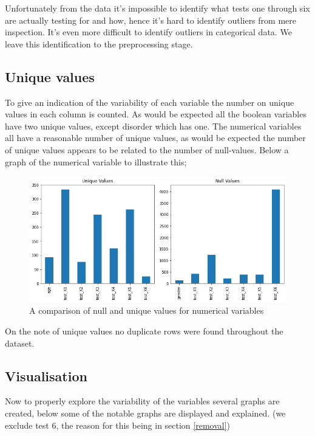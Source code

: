 \documentclass[a4paper]{article}
\begin{document}
Unfortunately from the data it's impossible to identify what tests one through six are actually testing for and how, hence it's hard to identify outliers from mere inspection. It's even more difficult to identify outliers in categorical data. We leave this identification to the preprocessing stage. 

\subsection*{Unique values} %

To give an indication of the variability of each variable the number on unique values in each column is counted. As would be expected all the boolean variables have two unique values, except disorder which has one. The numerical variables all have a reasonable number of unique values, as would be expected the number of unique values appears to be related to the number of null-values. Below a graph of the numerical variable to illustrate this;

\begin{figure}[h]
    \centering
    \includegraphics[width=0.75\linewidth]{Materials/Barplots/Unique_Null.png}
    \caption{A comparison of null and unique values for numerical variables}
    \label{fig:Unique_Null}
    
\end{figure}

On the note of unique values no duplicate rows were found throughout the dataset.

\subsection{Visualisation}

Now to properly explore the variability of the variables several graphs are created, below some of the notable graphs are displayed and explained. (we exclude test 6, the reason for this being in section \ref{removal})
\end{document}
